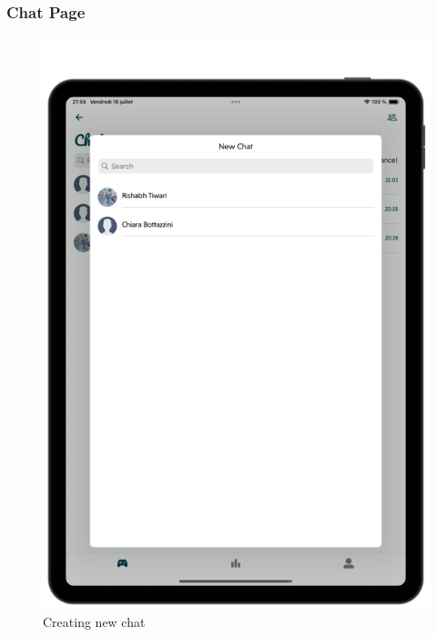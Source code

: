 \subsubsection{Chat Page}

\begin{figure}[H]
    \centering
    \begin{minipage}[b]{0.43\linewidth}
        \centering
        \includegraphics[width=\linewidth]{TabletUI/Creating a new chat.png}
        \caption{Creating new chat}
    \end{minipage}
    \hspace{0.1\linewidth}
    \begin{minipage}[b]{0.43\linewidth}
        \centering

\end{minipage}
\end{figure}
